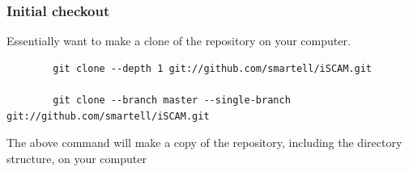 \begin{frame}[fragile]
	\frametitle{Initial checkout}
	Essentially want to make a clone of the repository on your computer.
	\vfill
	
	\begin{tiny}
		

	\begin{verbatim}
		git clone --depth 1 git://github.com/smartell/iSCAM.git
		
		git clone --branch master --single-branch git://github.com/smartell/iSCAM.git
	\end{verbatim}
	\end{tiny}
	\vfill
	The above command will make a copy of the repository, including the directory structure, on your computer
\end{frame}


